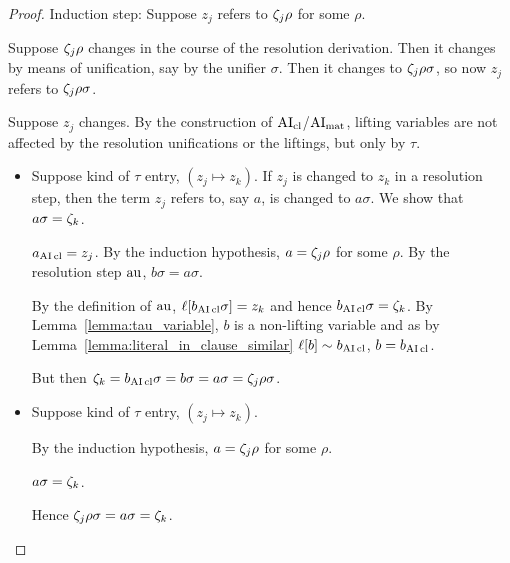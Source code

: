 \documentclass[,%
	paper=a4,%
	DIV12, %
	twoside=false,%
	liststotoc,
	bibtotoc,
	draft=false,%
	numbers=noendperiod
]{scrartcl}
\begin{document}
\begin{changebar}
\begin{proof}
	Induction step:
	Suppose $z_j$ refers to $\zeta_{j}\rho$ for some $\rho$.

	Suppose $\zeta_{j}\rho$ changes in the course of the resolution derivation.
	Then it changes by means of unification, say by the unifier $\sigma$.
	Then it changes to $\zeta_{j}\rho\sigma$, so now $z_j$ refers to $\zeta_{j}\rho\sigma$.

	Suppose $z_j$ changes. By the construction of $\operatorname{AI}_\mathrm{cl}$/$\operatorname{AI}_\mathrm{mat}$, lifting variables are not affected by the resolution unifications or the liftings, but only by $\tau$.


%
	
	\begin{itemize}
		\item Suppose  kind of $\tau$ entry, $(z_j \mapsto z_k)$.
			If $z_j$ is changed to $z_k$ in a resolution step,
			then the term $z_j$ refers to, say $a$, is changed to $a\sigma$.
			We show that $a\sigma = \zeta_{k}$.

			$a_{\operatorname{AI}\mathrm{cl}}=z_j$.
			By the induction hypothesis, 
			$a=\zeta_{j}\rho$ for some $\rho$.
			By the resolution step $\operatorname{au}$, $b\sigma=a\sigma$.


			By the definition of $\operatorname{au}$, 
			$\ell[b_{\operatorname{AI}\mathrm{cl}}\sigma] = z_k$
			and hence $b_{\operatorname{AI}\mathrm{cl}}\sigma = \zeta_{k}$.
			By Lemma~\ref{lemma:tau_variable}, $b$ is a non-lifting variable and
			as by Lemma~\ref{lemma:literal_in_clause_similar} $\ell[b] \sim b_{\operatorname{AI}\mathrm{cl}}$, $b=b_{\operatorname{AI}\mathrm{cl}}$.

			But then $\zeta_{k} = b_{\operatorname{AI}\mathrm{cl}}\sigma = b\sigma = a\sigma = \zeta_{j}\rho\sigma$.


		\item Suppose  kind of $\tau$ entry, $(z_j \mapsto z_k)$.\nopagebreak

			By the induction hypothesis, 
			$a=\zeta_{j}\rho$ for some $\rho$.

			$a\sigma = \zeta_{k}$.

			Hence $\zeta_{j}\rho \sigma = a\sigma = \zeta_{k}$.
			\qedhere
	\end{itemize}
\end{proof}


\end{changebar}
\end{document}
